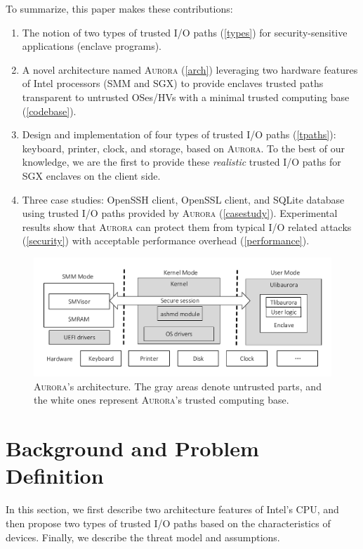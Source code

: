 To summarize, this paper makes these contributions:
\begin{enumerate}[]
\item The notion of two types of trusted I/O paths (\autoref{types}) for security-sensitive applications (enclave programs).
\item A novel architecture named \textsc{Aurora} (\autoref{arch}) leveraging two hardware features of Intel processors (SMM and SGX) to provide enclaves trusted paths transparent to untrusted OSes/HVs with a minimal trusted computing base (\autoref{codebase}).
\item Design and implementation of four types of trusted I/O paths (\autoref{tpaths}): keyboard, printer, clock, and storage, based on \textsc{Aurora}.  To the best of our knowledge, we are the first to provide these \emph{realistic} trusted I/O paths for SGX enclaves on the client side.
\item Three case studies: OpenSSH client, OpenSSL client, and SQLite database using trusted I/O paths provided by \textsc{Aurora} (\autoref{casestudy}). Experimental results show that \textsc{Aurora} can protect them from typical I/O related attacks (\autoref{security}) with acceptable performance overhead (\autoref{performance}).
\end{enumerate}

\begin{figure}[t]
	\centering
	\includegraphics[height=0.22\textheight]{figures/arch.pdf}
	\caption{\textsc{Aurora}'s architecture. The gray areas denote untrusted parts, and the white ones represent \textsc{Aurora}'s trusted computing base.}
	\label{fig:architecture}
\end{figure}

\section{Background and Problem Definition}
In this section, we first describe two architecture features of Intel's CPU, and then propose two types of trusted I/O paths based on the characteristics of devices. Finally, we describe the threat model and assumptions.

